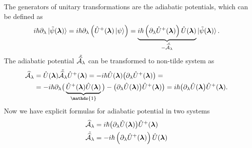 




The generators of unitary transformations are the adiabatic potentials, which can be defined as
\begin{equation}
    i\hbar\partial_\lambda \ket{\tilde{\psi}(\llambda)} = i\hbar \partial_\lambda\left(\U^+(\llambda)\ket{\psi} \right)= \underbrace{i\hbar\left(\partial_\lambda \U^+(\llambda)\right)\U(\llambda)}_{-\tilde{\AA_\lambda}}\ket{\tilde{\psi}(\llambda)}.
\end{equation}
The adiabatic potential $\tilde{\AA_\lambda}$ can be transformed to non-tilde system as
\begin{equation}
    \begin{split}
        \AA_\lambda&=\U(\llambda)\tilde{\AA_\lambda}\U^+(\llambda) = -i\hbar\U(\llambda)\big(\partial_\lambda \U^+(\llambda)\big) =\\
        &= -i\hbar\partial_\lambda\big(\underbrace{\U^+(\llambda)\U(\llambda)}_{\mathds{1}}\big)-\big(\partial_\lambda \U(\llambda)\big)\U^+(\llambda) \big) =i\hbar \big(\partial_\lambda \U(\llambda\big)\U^+(\llambda).
    \end{split}
\end{equation}
Now we have explicit formulas for adiabatic potential in two systems
\begin{align}
    \AA_\lambda&=i\hbar \big(\partial_\lambda \U(\llambda)\big)\U^+(\llambda)
    \label{eq:adiabaticPotential}\\
    \tilde{\AA_\lambda} &= -i\hbar\left(\partial_\lambda \U^+(\llambda)\right)\U(\llambda)
    \label{eq:adiabaticPotentialTilde}
\end{align}

